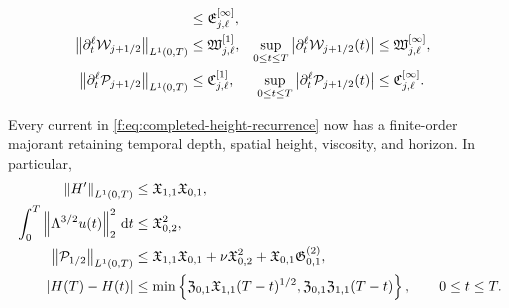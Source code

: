 {\begin{theorem}
\begin{samepage}
\begin{align}
 &\le\mathfrak E_{j,\ell}^{[\infty]},
 \label{f:eq:qc-sharp-energy-row-family}\\
 \left\lVert \partial_t^\ell\mathcal W_{j+1/2}\right\rVert_{L^1(0,T)}
 &\le\mathfrak W_{j,\ell}^{[1]},
 &
 \sup_{0\le t\le T}
 \left|\partial_t^\ell\mathcal W_{j+1/2}(t)\right|
 &\le\mathfrak W_{j,\ell}^{[\infty]},
 \label{f:eq:qc-sharp-force-work-row-family}\\
 \left\lVert \partial_t^\ell\mathcal P_{j+1/2}\right\rVert_{L^1(0,T)}
 &\le\mathfrak C_{j,\ell}^{[1]},
 &
 \sup_{0\le t\le T}
 \left|\partial_t^\ell\mathcal P_{j+1/2}(t)\right|
 &\le\mathfrak C_{j,\ell}^{[\infty]}.
 \label{f:eq:qc-sharp-production-row-family}
\end{align}
\end{samepage}
Every current in \eqref{f:eq:completed-height-recurrence} now has a
finite-order majorant retaining temporal depth, spatial height, viscosity,
and horizon.
In particular,
\begin{align}
 \left\lVert H'\right\rVert_{L^1(0,T)}
 &\le\mathfrak X_{1,1}\mathfrak X_{0,1},
 \label{f:eq:qc-sharp-height-variation}\\
 \int_0^T\left\lVert \Lambda^{3/2}u(t)\right\rVert_2^2\,\mathrm d t
 &\le\mathfrak X_{0,2}^2,
 \label{f:eq:qc-sharp-critical-dissipation}\\
 \left\lVert \mathcal P_{1/2}\right\rVert_{L^1(0,T)}
 &\le\mathfrak X_{1,1}\mathfrak X_{0,1}
 +\nu\mathfrak X_{0,2}^2
 +\mathfrak X_{0,1}\mathfrak G^{(2)}_{0,1},
 \label{f:eq:qc-sharp-critical-current}\\
 |H(T)-H(t)|
 &\le\min\left\{
 \mathfrak Z_{0,1}\mathfrak X_{1,1}(T-t)^{1/2},
 \mathfrak Z_{0,1}\mathfrak Z_{1,1}(T-t)
 \right\},
 \qquad 0\le t\le T.
 \label{f:eq:qc-sharp-critical-modulus}
\end{align}


\end{theorem}}
